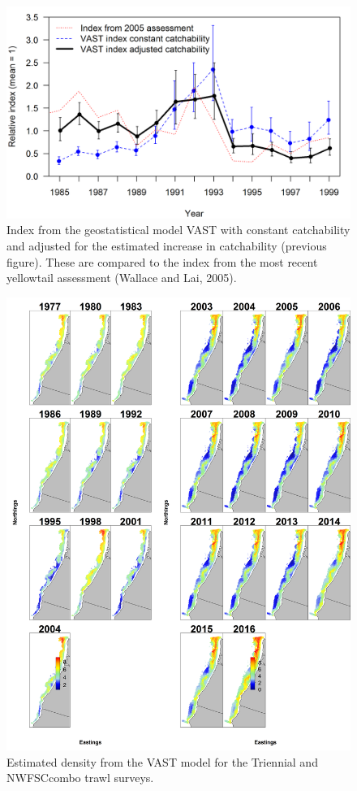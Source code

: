 \documentclass[12pt,]{article}
\begin{document}
\begin{figure}[htbp]
\centering
\includegraphics{Figures/ASHOP_index_illustration.png}
\caption{Index from the geostatistical model VAST with constant
catchability and adjusted for the estimated increase in catchability
(previous figure). These are compared to the index from the most recent
yellowtail assessment (Wallace and Lai, 2005).\label{fig:ASHOP_X4}}
\end{figure}

\begin{figure}[htbp]
\centering
\includegraphics{./tex2pdf.8516/418876a3152ede9954286c6d4a46a55943e1c5b6.png}
\caption{Estimated density from the VAST model for the Triennial and
NWFSCcombo trawl surveys.\label{fig:VAST_Dens}}
\end{figure}
\end{document}
